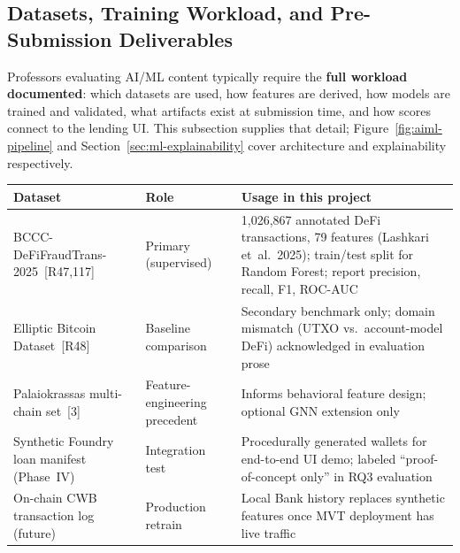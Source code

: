 \documentclass[12pt,a4paper]{report}
\newcommand{\tableheadcolor}{\rowcolor{TableHeadBg}}
\begin{document}
\subsection{Datasets, Training Workload, and Pre-Submission Deliverables}
\label{sec:ml-workload}

Professors evaluating AI/ML content typically require the \textbf{full workload documented}: which datasets are used, how features are derived, how models are trained and validated, what artifacts exist at submission time, and how scores connect to the lending UI. This subsection supplies that detail; Figure~\ref{fig:aiml-pipeline} and Section~\ref{sec:ml-explainability} cover architecture and explainability respectively.

\begin{table}[H]
\centering
\begin{tabular}{p{3.4cm}p{2.2cm}p{7.6cm}}
\toprule
\tableheadcolor
\textbf{Dataset} & \textbf{Role} & \textbf{Usage in this project} \\
\midrule
BCCC-DeFiFraudTrans-2025~[R47,117] & Primary (supervised) & 1,026,867 annotated DeFi transactions, 79 features (Lashkari et~al.~2025); train/test split for Random Forest; report precision, recall, F1, ROC-AUC \\
Elliptic Bitcoin Dataset~[R48] & Baseline comparison & Secondary benchmark only; domain mismatch (UTXO vs.\ account-model DeFi) acknowledged in evaluation prose \\
Palaiokrassas multi-chain set~[3] & Feature-engineering precedent & Informs behavioral feature design; optional GNN extension only \\
Synthetic Foundry loan manifest (Phase~IV) & Integration test & Procedurally generated wallets for end-to-end UI demo; labeled ``proof-of-concept only'' in RQ3 evaluation \\
On-chain CWB transaction log (future) & Production retrain & Local Bank history replaces synthetic features once MVT deployment has live traffic \\
\bottomrule
\end{tabular}
\end{table}
\end{document}
